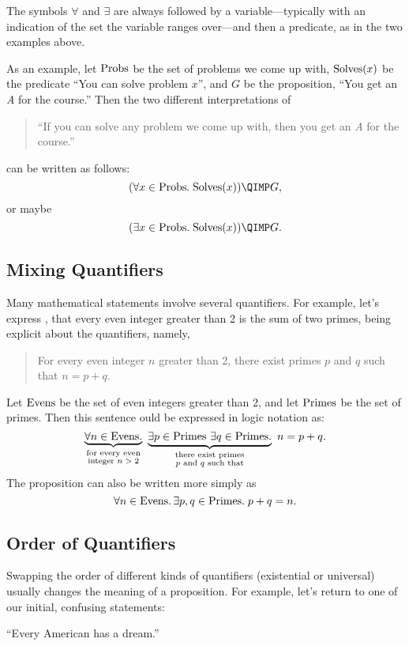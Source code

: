 The symbols $\forall$ and $\exists$ are always followed by a
variable---typically with an indication of the set the variable ranges
over---and then a predicate, as in the two examples above.

As an example, let $\text{Probs}$ be the set of problems we come up with,
$\text{Solves}(x)$ be the predicate ``You can solve problem $x$'', and $G$ be
the proposition, ``You get an \emph{A} for the course.''  Then the two
different interpretations of
%
\begin{quote}
  ``If you can solve any problem we come up with, then you get an \emph{A}
  for the course.''
\end{quote}
can be written as follows:
\[
(\forall x \in \probs.\; \solves(x)) \QIMP G,
\]
or maybe
\[
(\exists x \in \probs.\; \solves(x)) \QIMP G.
\]

\subsection{Mixing Quantifiers}

Many mathematical statements involve several quantifiers.  For
example, let's express , that every even
integer greater than 2 is the sum of two primes, being explicit about
the quantifiers, namely,
%
\begin{quote}
For every even integer $n$ greater than 2, there exist primes $p$ and
$q$ such that $n = p + q$.
\end{quote}
Let $\text{Evens}$ be the set of even integers greater than 2, and let
$\text{Primes}$ be the set of primes.  Then this sentence
ould be expressed in logic notation as:
%
\begin{equation}\label{AEEGC}
\underbrace{\forall n \in \text{Evens}.}_{\substack
    {\text{for every even} \\
     \text{integer $n > 2$}}}
\
\underbrace{\exists p \in \text{Primes}\ \exists q \in \text{Primes}.}_{\substack
    {\text{there exist primes} \\
     \text{$p$ and $q$ such that}}}
\ n = p + q.
\end{equation}
The proposition can also be written more simply as
\[
 \forall n \in \text{Evens}.\, \exists p, q \in \text{Primes}. \; p + q = n.
\]

\subsection{Order of Quantifiers}

Swapping the order of different kinds of quantifiers (existential or
universal) usually changes the meaning of a proposition.  For example,
let's return to one of our initial, confusing statements:
\begin{center}
``Every American has a dream.''
\end{center}


